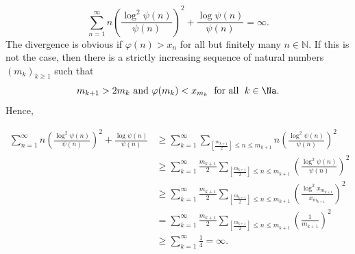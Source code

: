 \documentclass[12pt,a4paper]{amsart}
\begin{document}
\[
    \sum_{n=1}^\infty n \left(\frac{\log^{2}\psi(n)}{\psi(n)}\right)^2 + \frac{\log \psi(n)}{\psi(n)} = \infty.
\]
The divergence is obvious if $\varphi(n)>x_n$ for all but finitely many $n \in \mathbb{N}$. If this is not the case, then there is a strictly increasing sequence of natural numbers $(m_k)_{k\geq 1}$ such that
\[
m_{k+1}>2m_k \text{ and } \varphi(m_k) < x_{m_k}
\;\text{ for all }\;k\in\Na.
\]
Hence,

\begin{align*}
    \sum_{n=1}^\infty n \left(\frac{\log^{2}\psi(n)}{\psi(n)}\right)^2 + \frac{\log \psi(n)}{\psi(n)} 
    &\geq 
    \sum_{k=1}^\infty 
    \sum_{\left[\frac{m_{k+1}}{2}\right] \leq n \leq m_{k+1}} 
     n \left(\frac{\log^{2}\psi(n)}{\psi(n)}\right)^2\\
    &\geq 
    \sum_{k=1}^\infty \frac{m_{k+1}}{2} 
    \sum_{\left[\frac{m_{k+1}}{2}\right] \leq n \leq m_{k+1}} 
    \left(\frac{\log^{2}\psi(n)}{\psi(n)}\right)^2\\
    &
    \geq 
    \sum_{k=1}^\infty \frac{m_{k+1}}{2} 
    \sum_{\left[\frac{m_{k+1}}{2}\right] \leq n \leq m_{k+1}} 
    \left(\frac{\log^{2}x_{m_{k+1}}}{x_{m_{k+1}}}\right)^2\\
    &= 
    \sum_{k=1}^\infty \frac{m_{k+1}}{2} 
    \sum_{\left[\frac{m_{k+1}}{2}\right] \leq n \leq m_{k+1}} 
    \left(\frac{1}{m_{k+1}}\right)^2 \\
    &\geq 
    \sum_{k=1}^\infty \frac{1}{4}=\infty.
\end{align*}
\end{document}
